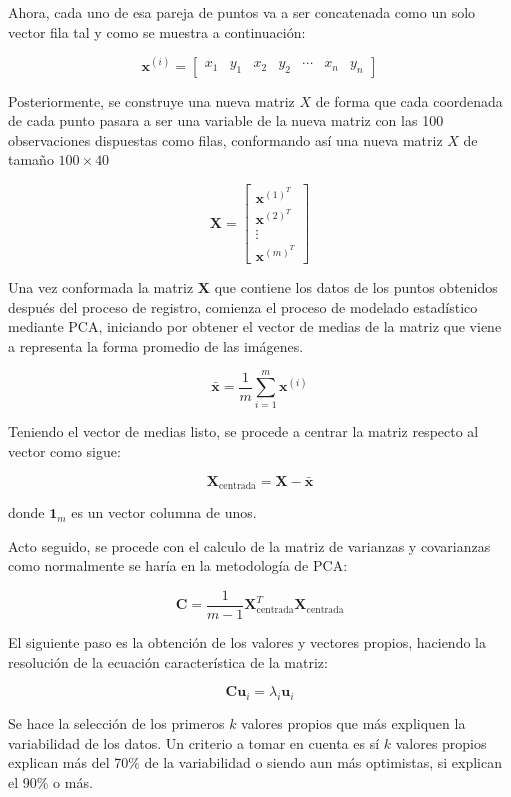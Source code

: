 \documentclass[11pt, letterpaper]{article}
\begin{document}
Ahora, cada uno de esa pareja de puntos va a ser concatenada como un solo vector fila tal y como se muestra a continuación:

$$
\mathbf{x}^{(i)} = \begin{bmatrix} x_1 & y_1 & x_2 & y_2 & \cdots & x_n & y_n \end{bmatrix}
$$

Posteriormente, se construye una nueva matriz $X$ de forma que cada coordenada de cada punto pasara a ser una variable de la nueva matriz con las 100 observaciones dispuestas como filas, conformando así una nueva matriz $X$ de tamaño $100\times40$

$$
\mathbf{X} =
\begin{bmatrix}
	\mathbf{x}^{(1)^T} \\
	\mathbf{x}^{(2)^T} \\
	\vdots \\
	\mathbf{x}^{(m)^T}
\end{bmatrix}
$$

Una vez conformada la matriz $\mathbf{X}$ que contiene los datos de los puntos obtenidos después del proceso de registro, comienza el proceso de modelado estadístico mediante PCA, iniciando por obtener el vector de medias de la matriz que viene a representa la forma promedio de las imágenes.

$$
\bar{\mathbf{x}} = \frac{1}{m} \sum_{i=1}^{m} \mathbf{x}^{(i)}
$$

Teniendo el vector de medias listo, se procede a centrar la matriz respecto al vector como sigue:

$$
\mathbf{X}_{\text{centrada}} = \mathbf{X} - \bar{\mathbf{x}}
$$

donde \( \mathbf{1}_m \) es un vector columna de unos.

Acto seguido, se procede con el calculo de la matriz de varianzas y covarianzas como normalmente se haría en la metodología de PCA:


$$
\mathbf{C} = \frac{1}{m - 1} \mathbf{X}_{\text{centrada}}^T \mathbf{X}_{\text{centrada}} 
$$

El siguiente paso es la obtención de los valores y vectores propios, haciendo la resolución de la ecuación característica de la matriz:


$$
\mathbf{C} \mathbf{u}_i = \lambda_i \mathbf{u}_i
$$

Se hace la selección de los primeros $k$ valores propios que más expliquen la variabilidad de los datos. Un criterio a tomar en cuenta es sí $k$ valores propios explican más del 70\% de la variabilidad o siendo aun más optimistas, si explican el 90\% o más.
\end{document}
